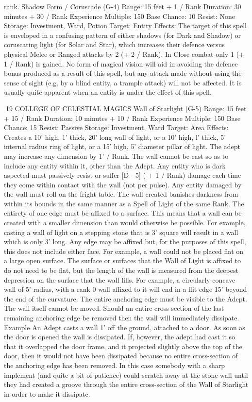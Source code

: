 \documentclass[a4paper]{article}
\begin{document}
\begin{multicols}{3}
rank.
Shadow Form / Coruscade (G-4)
Range: 15 feet + 1 / Rank
Duration: 30 minutes + 30 / Rank
Experience Multiple: 150
Base Chance: 10%
Resist: None
Storage: Investment, Ward, Potion
Target: Entity
Effects: The target of this spell is enveloped in a
confusing pattern of either shadows (for Dark and
Shadow) or coruscating light (for Solar and Star),
which increases their defence versus physical
Melee or Ranged attacks by 2 (+ 2 / Rank). In
Close combat only 1 (+ 1 / Rank) is gained. No
form of magical vision will aid in avoiding the
defence bonus produced as a result of this spell, but
any attack made without using the sense of sight
(e.g. by a blind entity, a trample attack) will not be
affected. It is usually quite apparent when an entity
is under the effect of this spell.

19 COLLEGE OF CELESTIAL MAGICS
Wall of Starlight (G-5)
Range: 15 feet + 15 / Rank
Duration: 10 minutes + 10 / Rank
Experience Multiple: 150
Base Chance: 15%
Resist: Passive
Storage: Investment, Ward
Target: Area
Effects: Creates a 10’ high, 1’ thick, 20’ long wall
of light, or a 10’ high, l’ thick, 5’ internal radius
ring of light, or a 15’ high, 5’ diameter pillar of
light.
The adept may increase any dimension by 1’ /
Rank. The wall cannot be cast so as to include any
entity within it, other than the Adept. Any entity
who is dark aspected must passively resist or suffer
[D - 5] ( + 1 / Rank) damage each time they come
within contact with the wall (not per pulse). Any
entity damaged by the wall must roll on the fright
table. The wall created banishes darkness from
within its bounds in the same manner as a Spell of
Light of the same Rank. The entirety of one edge
must be affixed to a surface. This means that a wall
can be created with a smaller dimension than
would otherwise be possible. For example, casting
a wall of light on a stepping stone that is 3’ square
will result in a wall which is only 3’ long. Any
edge may be affixed but, for the purposes of this
spell, this does not include either face. For example, a wall could not be placed flat on a large open
surface. The surface or surfaces that the Wall of
Light is affixed to do not need to be flat, but the
length of the wall is measured from the deepest
depression on the surface that the wall fills. For
example, a circularly concave wall of 5’ radius,
with a rank 0 wall affixed to it will end in a flit
edge 15’ beyond the end of the curvature. The
entire anchoring edge must be visible to the Adept.
The wall itself cannot be moved. Should an entire
cross-section of the last remaining anchoring edge
be removed then the wall will immediately dissipate.
Example
An Adept casts a wall 1’ off the ground,
attached to a door. As soon as the door is opened the wall
is dissipated. If, however, the adept had cast it so that it
overlapped the door frame, and it projected slightly above
the top of the door, then it would not have been dissipated
because no entire cross-section of the anchoring edge has
been removed. In this case somebody with a sharp implement (and quite a bit of patience) could scratch away at
the stone wall until they had created a groove through the
entire cross-section of the Wall of Starlight in order to
make it dissipate.


\end{multicols}
\end{document}
